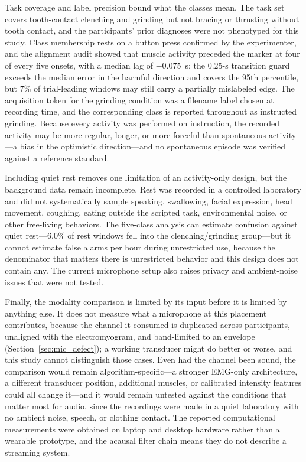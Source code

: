 \documentclass[pdflatex,sn-nature,iicol]{sn-jnl}
\begin{document}
Task coverage and label precision bound what the classes mean. The task set covers tooth-contact clenching and grinding but not bracing or thrusting without tooth contact, and the participants' prior diagnoses were not phenotyped for this study. Class membership rests on a button press confirmed by the experimenter, and the alignment audit showed that muscle activity preceded the marker at four of every five onsets, with a median lag of $-0.075$~s; the 0.25-s transition guard exceeds the median error in the harmful direction and covers the 95th percentile, but 7\% of trial-leading windows may still carry a partially mislabeled edge. The acquisition token for the grinding condition was a filename label chosen at recording time, and the corresponding class is reported throughout as instructed grinding. Because every activity was performed on instruction, the recorded activity may be more regular, longer, or more forceful than spontaneous activity---a bias in the optimistic direction---and no spontaneous episode was verified against a reference standard.

Including quiet rest removes one limitation of an activity-only design, but the background data remain incomplete. Rest was recorded in a controlled laboratory and did not systematically sample speaking, swallowing, facial expression, head movement, coughing, eating outside the scripted task, environmental noise, or other free-living behaviors. The five-class analysis can estimate confusion against quiet rest---6.0\% of rest windows fell into the clenching/grinding group---but it cannot estimate false alarms per hour during unrestricted use, because the denominator that matters there is unrestricted behavior and this design does not contain any. The current microphone setup also raises privacy and ambient-noise issues that were not tested.

Finally, the modality comparison is limited by its input before it is limited by anything else. It does not measure what a microphone at this placement contributes, because the channel it consumed is duplicated across participants, unaligned with the electromyogram, and band-limited to an envelope (Section~\ref{sec:mic_defect}); a working transducer might do better or worse, and this study cannot distinguish those cases. Even had the channel been sound, the comparison would remain algorithm-specific---a stronger EMG-only architecture, a different transducer position, additional muscles, or calibrated intensity features could all change it---and it would remain untested against the conditions that matter most for audio, since the recordings were made in a quiet laboratory with no ambient noise, speech, or clothing contact. The reported computational measurements were obtained on laptop and desktop hardware rather than a wearable prototype, and the acausal filter chain means they do not describe a streaming system.
\end{document}
